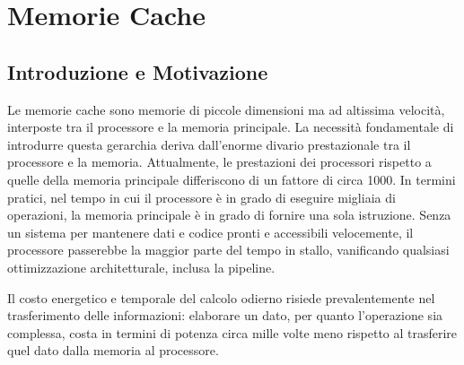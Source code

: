 \chapter{Memorie Cache}
\label{ch:memorie-cache}

\section{Introduzione e Motivazione}
Le memorie cache sono memorie di piccole dimensioni ma ad altissima velocità, interposte tra il processore e la memoria principale.
La necessità fondamentale di introdurre questa gerarchia deriva dall'enorme divario prestazionale tra il processore e la memoria. Attualmente, le prestazioni dei processori rispetto a quelle della memoria principale differiscono di un fattore di circa 1000. In termini pratici, nel tempo in cui il processore è in grado di eseguire migliaia di operazioni, la memoria principale è in grado di fornire una sola istruzione. Senza un sistema per mantenere dati e codice pronti e accessibili velocemente, il processore passerebbe la maggior parte del tempo in stallo, vanificando qualsiasi ottimizzazione architetturale, inclusa la pipeline. 

Il costo energetico e temporale del calcolo odierno risiede prevalentemente nel trasferimento delle informazioni: elaborare un dato, per quanto l'operazione sia complessa, costa in termini di potenza circa mille volte meno rispetto al trasferire quel dato dalla memoria al processore.

